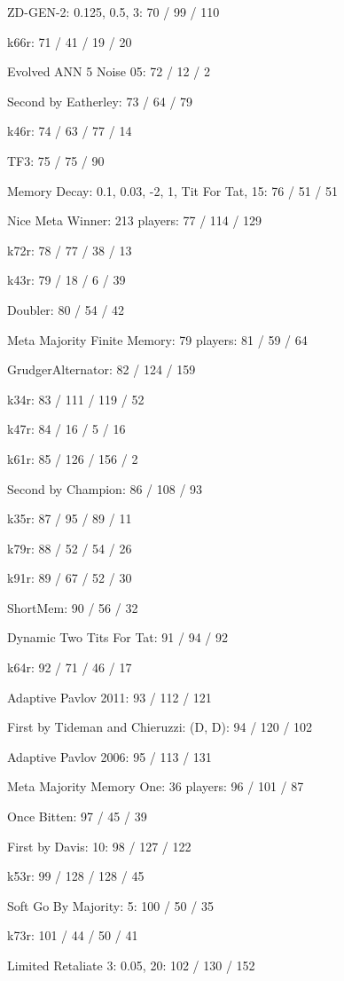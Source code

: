 \item ZD-GEN-2: 0.125, 0.5, 3: 70 / 99 / 110
\item k66r: 71 / 41 / 19 / 20
\item Evolved ANN 5 Noise 05: 72 / 12 / 2
\item Second by Eatherley: 73 / 64 / 79
\item k46r: 74 / 63 / 77 / 14
\item TF3: 75 / 75 / 90
\item Memory Decay: 0.1, 0.03, -2, 1, Tit For Tat, 15: 76 / 51 / 51
\item Nice Meta Winner: 213 players: 77 / 114 / 129
\item k72r: 78 / 77 / 38 / 13
\item k43r: 79 / 18 / 6 / 39
\item Doubler: 80 / 54 / 42
\item Meta Majority Finite Memory: 79 players: 81 / 59 / 64
\item GrudgerAlternator: 82 / 124 / 159
\item k34r: 83 / 111 / 119 / 52
\item k47r: 84 / 16 / 5 / 16
\item k61r: 85 / 126 / 156 / 2
\item Second by Champion: 86 / 108 / 93
\item k35r: 87 / 95 / 89 / 11
\item k79r: 88 / 52 / 54 / 26
\item k91r: 89 / 67 / 52 / 30
\item ShortMem: 90 / 56 / 32
\item Dynamic Two Tits For Tat: 91 / 94 / 92
\item k64r: 92 / 71 / 46 / 17
\item Adaptive Pavlov 2011: 93 / 112 / 121
\item First by Tideman and Chieruzzi: (D, D): 94 / 120 / 102
\item Adaptive Pavlov 2006: 95 / 113 / 131
\item Meta Majority Memory One: 36 players: 96 / 101 / 87
\item Once Bitten: 97 / 45 / 39
\item First by Davis: 10: 98 / 127 / 122
\item k53r: 99 / 128 / 128 / 45
\item Soft Go By Majority: 5: 100 / 50 / 35
\item k73r: 101 / 44 / 50 / 41
\item Limited Retaliate 3: 0.05, 20: 102 / 130 / 152
